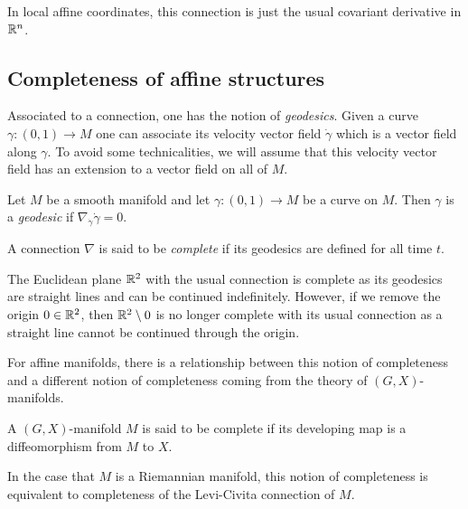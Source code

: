 \begin{remark}
    In local affine coordinates, this connection is just the usual covariant derivative in $\mathbb{R}^n$.
\end{remark}

\subsection{Completeness of affine structures}
Associated to a connection, one has the notion of \emph{geodesics}. Given a
curve $\gamma: (0,1) \to M$ one can associate its velocity vector field
$\dot{\gamma}$ which is a vector field along $\gamma$. To avoid some
technicalities, we will assume that this velocity vector field has an extension
to a vector field on all of $M$.

\begin{definition}
    Let $M$ be a smooth manifold and let $\gamma: (0,1) \to M$ be a curve on $M$. Then $\gamma$ is
    a \emph{geodesic} if $\nabla_{\dot{\gamma}} \dot{\gamma} =0$.
\end{definition}
\begin{definition}
    A connection $\nabla$ is said to be \emph{complete} if its geodesics are defined for all time $t$.
\end{definition}
\begin{remark}
    The Euclidean plane $\mathbb{R}^2$ with the usual connection is complete as its geodesics are straight lines and can be continued indefinitely.
    However, if we remove the origin $0 \in \mathbb{R}^2$, then $\mathbb{R}^2 \setminus 0$ is no longer complete with its usual connection as a straight line cannot be continued through the origin.
\end{remark}

For affine manifolds, there is a relationship between this notion of
completeness and a different notion of completeness coming from the theory of
$(G,X)$-manifolds.
\begin{definition}\label{def:dev-complete}
    A $(G,X)$-manifold $M$ is said to be complete if its developing map is a diffeomorphism
    from $M$ to $X$.
\end{definition}

\begin{remark}
    In the case that $M$ is a Riemannian manifold, this notion of completeness is
    equivalent to completeness of the Levi-Civita connection of $M$.
\end{remark}

